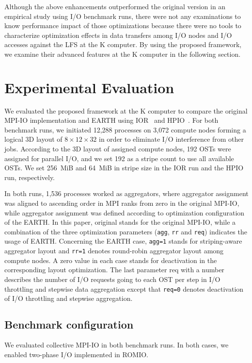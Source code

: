 \documentclass{jhps}
\begin{document}
Although the above enhancements outperformed the original version
in an empirical study using I/O benchmark runs, there were not any examinations
to know performance impact of those optimizations because there were no tools
to characterize optimization effects in data transfers among I/O nodes and
I/O accesses against the LFS at the K computer.
By using the proposed framework, we examine their advanced features at the K computer
in the following section.

\section{Experimental Evaluation}
\label{sec:EVAL}

We evaluated the proposed framework at the K computer to compare
the original MPI-IO implementation and EARTH using IOR~\cite{IOR:web}
and HPIO~\cite{ching:ipdps06}.
For both benchmark runs, we initiated 12,288 processes on 3,072 compute nodes
forming a logical 3D layout of $8\times12\times32$ in order to eliminate I/O interference
from other jobs. According to the 3D layout of assigned compute nodes,
192 OSTs were assigned for parallel I/O, and we set 192 as a stripe count
to use all available OSTs.
We set 256~MiB and 64~MiB in stripe size in the IOR run and the HPIO run, respectively.

In both runs, 1,536 processes worked as aggregators, where aggregator assignment
was aligned to ascending order in MPI ranks from zero in the original MPI-IO,
while aggregator assignment was defined according to optimization configuration
of the EARTH.
In this paper, original stands for the original MPI-IO, while a combination of
the three optimization parameters ({\tt agg}, {\tt rr} and {\tt req}) indicates
the usage of EARTH.
Concerning the EARTH case, {\tt agg=1} stands for striping-aware aggregator layout
and {\tt rr=1} denotes round-robin aggregator layout among compute nodes.
A zero value in each case stands for deactivation in the corresponding layout optimization.
The last parameter req with a number describes the number of I/O requests
going to each OST per step in I/O throttling and stepwise data aggregation
except that {\tt req=0} denotes deactivation of I/O throttling and stepwise aggregation.

\subsection{Benchmark configuration}

We evaluated collective MPI-IO in both benchmark runs.
In both cases, we enabled two-phase I/O implemented in ROMIO.
\end{document}
